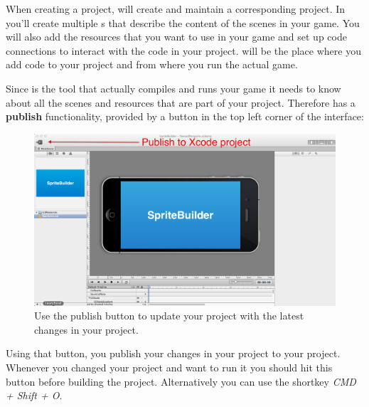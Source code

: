 When creating a \SB{} project, \SB{} will create and maintain a corresponding
\xcode{} project. In \SB{} you'll create multiple \ccbfile{}s that describe
the content of the scenes in your game. You will also add the resources that
you want to use in your game and set up code connections to interact with the
code in your \xcode{} project. \xcode{} will be the place where you add code to
your project and from where you run the actual game.

Since \xcode{} is the tool that actually compiles and runs your game it needs
to know about all the scenes and resources that are part of your \SB{} project.
Therefore \SB{} has a \textbf{publish} functionality, provided by
a button in the top left corner of the interface:
\begin{figure}[H]
		\centering
		\includegraphics[width=0.9\linewidth]{images/spritebuilder/spritebuilder_publish_button.png}
		\caption{Use the publish button to update your \xcode{} project with the
		latest changes in your \SB{} project.}
\end{figure}
Using that button, you publish your changes in your
\SB{} project to your \xcode{} project. Whenever you changed your \SB{}
project and want to run it you should hit this button before building the \xcode{}
project. Alternatively you can use the shortkey \textit{CMD + Shift + O}.

